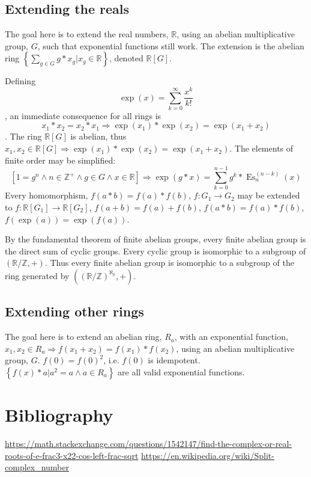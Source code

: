 \documentclass[]{article}
\DeclareMathOperator{\es}{Es}
\newcommand{\pqty}[1]{{\left(#1\right)}}
\newcommand{\Bqty}[1]{{\left\{#1\right\}}}
\newcommand{\bqty}[1]{{\left[#1\right]}}
\numberwithin{equation}{section}
\begin{document}
	\subsection{Extending the reals}
	The goal here is to extend the real numbers, $\mathbb{R}$, using an abelian multiplicative group, $G$, such that exponential functions still work. The extension is the abelian ring $\Bqty{\sum_{g\in G}g*x_g \bigg\vert x_g\in\mathbb{R}}$, denoted $\mathbb{R}\bqty{G}$.
	
	Defining
	\begin{equation}
	\exp(x)=\sum_{k=0}^{\infty}\frac{x^k}{k!}
	\end{equation}
	, an immediate consequence for all rings is
	\begin{equation}
	x_1*x_2=x_2*x_1\Rightarrow\exp(x_1)*\exp(x_2)=\exp(x_1+x_2)
	\end{equation}
	. The ring $\mathbb{R}\bqty{G}$ is abelian, thus $x_1,x_2\in\mathbb{R}\bqty{G}\Rightarrow\exp(x_1)*\exp(x_2)=\exp(x_1+x_2)$. The elements of finite order may be simplified:
	\begin{equation}
	\bqty{1=g^n\land n\in\mathbb{Z}^+\land g\in G\land x\in\mathbb{R}}\Rightarrow\exp\pqty{g*x}=\sum_{k=0}^{n-1}g^k*\es_n^{(n-k)}\pqty{x}
	\end{equation}
	Every homomorphism, $f\pqty{a*b}=f\pqty{a}*f\pqty{b}$, $f:G_1\rightarrow G_2$ may be extended to $f:\mathbb{R}\bqty{G_1}\rightarrow \mathbb{R}\bqty{G_2}$, $f\pqty{a+b}=f\pqty{a}+f\pqty{b}$, $f\pqty{a*b}=f\pqty{a}*f\pqty{b}$, $f\pqty{\exp\pqty{a}}=\exp\pqty{f\pqty{a}}$.
	
	By the fundamental theorem of finite abelian groups, every finite abelian group is the direct sum of cyclic groups. Every cyclic group is isomorphic to a subgroup of $\pqty{\mathbb{R}/\mathbb{Z},+}$. Thus every finite abelian group is isomorphic to a subgroup of the ring generated by $\pqty{\pqty{\mathbb{R}/\mathbb{Z}}^{\aleph_0},+}$.
	
	\subsection{Extending other rings}
	The goal here is to extend an abelian ring, $R_a$, with an exponential function, $x_1,x_2\in R_a\Rightarrow f(x_1+x_2)=f(x_1)*f(x_2)$, using an abelian multiplicative group, $G$.
	$
	f\pqty{0}=f\pqty{0}^2
	$, i.e. $f\pqty{0}$ is idempotent. $\Bqty{f(x)*a \vert a^2=a\land a\in R_a}$ are all valid exponential functions.
	
	
	
	\section{Bibliography}
	\url{https://math.stackexchange.com/questions/1542147/find-the-complex-or-real-roots-of-e-frac3-x22-cos-left-frac-sqrt}
	\url{https://en.wikipedia.org/wiki/Split-complex_number}
	
\end{document}
